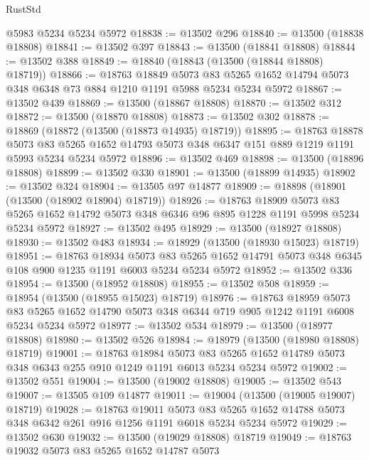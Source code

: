 \begin{lexlean}{RustStd}
\begin{coremodule}
    @5983
    @5234
    @5234
    @5972
@18838 := @13502 @296
@18840 := @13500 (@18838 @18808)
@18841 := @13502 @397
@18843 := @13500 (@18841 @18808)
@18844 := @13502 @388
@18849 := @18840 (@18843 (@13500 (@18844 @18808) @18719))
@18866 := @18763
    @18849
    @5073
    @83
    @5265
    @1652
    @14794
    @5073
    @348
    @6348
    @73
    @884
    @1210
    @1191
    @5988
    @5234
    @5234
    @5972
@18867 := @13502 @439
@18869 := @13500 (@18867 @18808)
@18870 := @13502 @312
@18872 := @13500 (@18870 @18808)
@18873 := @13502 @302
@18878 := @18869 (@18872 (@13500 (@18873 @14935) @18719))
@18895 := @18763
    @18878
    @5073
    @83
    @5265
    @1652
    @14793
    @5073
    @348
    @6347
    @151
    @889
    @1219
    @1191
    @5993
    @5234
    @5234
    @5972
@18896 := @13502 @469
@18898 := @13500 (@18896 @18808)
@18899 := @13502 @330
@18901 := @13500 (@18899 @14935)
@18902 := @13502 @324
@18904 := @13505 @97 @14877
@18909 := @18898 (@18901 (@13500 (@18902 @18904) @18719))
@18926 := @18763
    @18909
    @5073
    @83
    @5265
    @1652
    @14792
    @5073
    @348
    @6346
    @96
    @895
    @1228
    @1191
    @5998
    @5234
    @5234
    @5972
@18927 := @13502 @495
@18929 := @13500 (@18927 @18808)
@18930 := @13502 @483
@18934 := @18929 (@13500 (@18930 @15023) @18719)
@18951 := @18763
    @18934
    @5073
    @83
    @5265
    @1652
    @14791
    @5073
    @348
    @6345
    @108
    @900
    @1235
    @1191
    @6003
    @5234
    @5234
    @5972
@18952 := @13502 @336
@18954 := @13500 (@18952 @18808)
@18955 := @13502 @508
@18959 := @18954 (@13500 (@18955 @15023) @18719)
@18976 := @18763
    @18959
    @5073
    @83
    @5265
    @1652
    @14790
    @5073
    @348
    @6344
    @719
    @905
    @1242
    @1191
    @6008
    @5234
    @5234
    @5972
@18977 := @13502 @534
@18979 := @13500 (@18977 @18808)
@18980 := @13502 @526
@18984 := @18979 (@13500 (@18980 @18808) @18719)
@19001 := @18763
    @18984
    @5073
    @83
    @5265
    @1652
    @14789
    @5073
    @348
    @6343
    @255
    @910
    @1249
    @1191
    @6013
    @5234
    @5234
    @5972
@19002 := @13502 @551
@19004 := @13500 (@19002 @18808)
@19005 := @13502 @543
@19007 := @13505 @109 @14877
@19011 := @19004 (@13500 (@19005 @19007) @18719)
@19028 := @18763
    @19011
    @5073
    @83
    @5265
    @1652
    @14788
    @5073
    @348
    @6342
    @261
    @916
    @1256
    @1191
    @6018
    @5234
    @5234
    @5972
@19029 := @13502 @630
@19032 := @13500 (@19029 @18808) @18719
@19049 := @18763
    @19032
    @5073
    @83
    @5265
    @1652
    @14787
    @5073

\end{coremodule}
\end{lexlean}
